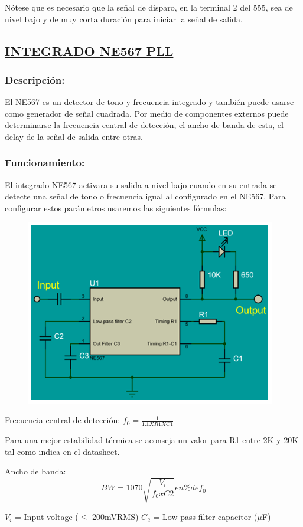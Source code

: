 \documentclass[a4paper,11pt]{article}
\begin{document}
Nótese que es necesario que la señal de disparo, en la terminal 2 del 555, sea de nivel bajo y de muy corta duración para iniciar la señal de salida.

\subsection{\underline{INTEGRADO NE567 PLL}}
\subsubsection{Descripción: }
El NE567 es un detector de tono y frecuencia integrado y también puede usarse como generador de señal cuadrada. Por medio de componentes externos puede determinarse la frecuencia central de detección, el ancho de banda de esta, el delay de la señal de salida entre otras.
\subsubsection{Funcionamiento: }
El integrado NE567 activara su salida a nivel bajo cuando en su entrada se detecte una señal de tono o frecuencia igual al configurado en el NE567. Para configurar estos parámetros usaremos las siguientes fórmulas:

	\begin{figure}[h]
		\centering
		\includegraphics[width=0.7\linewidth]{./9}
	\end{figure}
	
Frecuencia central de detección: $f_0 = \frac{1}{1.1 X R1 X C1}$

Para una mejor estabilidad térmica se aconseja un valor para R1 entre 2K y 20K tal como indica en el datasheet.

Ancho de banda: $$BW	= 1070 \sqrt{\frac{V_i}{f_0 x C2}}en \% de f_0 $$

$V_i$ = Input voltage ($\leq$ 200mVRMS) 
$C_2$ = Low-pass filter capacitor ($\mu$F)
\end{document}

